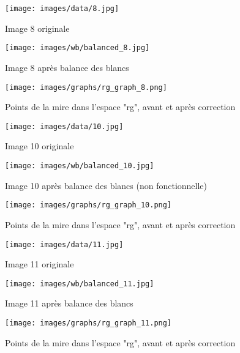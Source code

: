 \documentclass[12pt]{article}
\begin{document}
\begin{figure}[H]
    \centering
    \begin{minipage}{0.32\textwidth}
        \centering
        \texttt{[image: images/data/8.jpg]}
        \caption{Image 8 originale}
    \end{minipage}
    \hfill
    \begin{minipage}{0.32\textwidth}
        \centering
        \texttt{[image: images/wb/balanced\_8.jpg]}
        \caption{Image 8 après balance des blancs}
    \end{minipage}
    \begin{minipage}{0.32\textwidth}
        \centering
        \texttt{[image: images/graphs/rg\_graph\_8.png]}
        \caption{Points de la mire dans l'espace "rg", avant et après correction}
    \end{minipage}
\end{figure}

\begin{figure}[H]
    \centering
    \begin{minipage}{0.32\textwidth}
        \centering
        \texttt{[image: images/data/10.jpg]}
        \caption{Image 10 originale}
    \end{minipage}
    \hfill
    \begin{minipage}{0.32\textwidth}
        \centering
        \texttt{[image: images/wb/balanced\_10.jpg]}
        \caption{Image 10 après balance des blancs (non fonctionnelle)}
    \end{minipage}
    \begin{minipage}{0.32\textwidth}
        \centering
        \texttt{[image: images/graphs/rg\_graph\_10.png]}
        \caption{Points de la mire dans l'espace "rg", avant et après correction}
    \end{minipage}
\end{figure}

\begin{figure}[H]
    \centering
    \begin{minipage}{0.32\textwidth}
        \centering
        \texttt{[image: images/data/11.jpg]}
        \caption{Image 11 originale}
    \end{minipage}
    \hfill
    \begin{minipage}{0.32\textwidth}
        \centering
        \texttt{[image: images/wb/balanced\_11.jpg]}
        \caption{Image 11 après balance des blancs}
    \end{minipage}
    \begin{minipage}{0.32\textwidth}
        \centering
        \texttt{[image: images/graphs/rg\_graph\_11.png]}
        \caption{Points de la mire dans l'espace "rg", avant et après correction}
    \end{minipage}
\end{figure}
\end{document}
